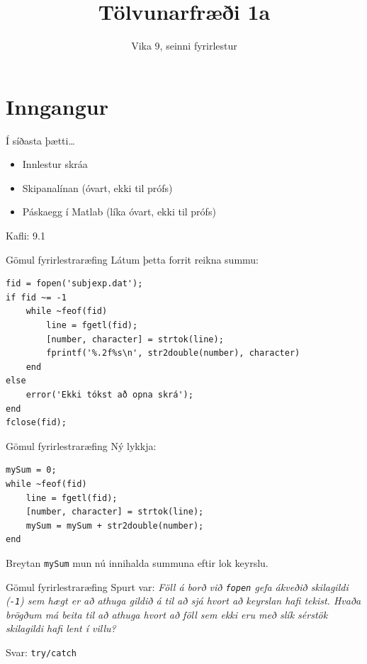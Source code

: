\documentclass{beamer}
\title{Tölvunarfræði 1a}
\subtitle{Vika 9, seinni fyrirlestur}
\begin{document}
\begin{frame}
\titlepage
\end{frame}

\section{Inngangur}

\begin{frame}{Í síðasta þætti\ldots}
\begin{itemize}
 \item Innlestur skráa
 \item Skipanalínan (óvart, ekki til prófs)
 \item Páskaegg í Matlab (líka óvart, ekki til prófs)
\end{itemize}
Kafli: 9.1
\end{frame}

\begin{frame}[fragile]{Gömul fyrirlestraræfing}
Látum þetta forrit reikna summu:
\begin{verbatim}
fid = fopen('subjexp.dat');
if fid ~= -1
    while ~feof(fid)
        line = fgetl(fid);
        [number, character] = strtok(line);
        fprintf('%.2f%s\n', str2double(number), character)
    end
else
    error('Ekki tókst að opna skrá');
end
fclose(fid);
\end{verbatim}
\end{frame}

\begin{frame}[fragile]{Gömul fyrirlestraræfing}
Ný lykkja:
\begin{verbatim}
mySum = 0;
while ~feof(fid)
    line = fgetl(fid);
    [number, character] = strtok(line);
    mySum = mySum + str2double(number);
end
\end{verbatim}
Breytan \texttt{mySum} mun nú innihalda summuna eftir lok keyrslu.
\end{frame}

\begin{frame}[fragile]{Gömul fyrirlestraræfing}
Spurt var:
\emph{Föll á borð við \texttt{fopen} gefa ákveðið skilagildi (\texttt{-1}) sem hægt er að athuga gildið á til að sjá hvort að keyrslan hafi tekist. Hvaða brögðum má beita til að athuga hvort að föll sem ekki eru með slík sérstök skilagildi hafi lent í villu?}
\pause

\vspace{1cm}
Svar: \texttt{try/catch}
\end{frame}
\end{document}
